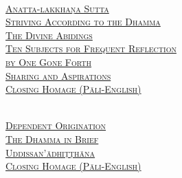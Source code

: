 {  {\libertinusFont\selectfont\textbf{\textsc{\ifafiveversion\fontsize{18}{12}\fi\ifninebythirteenversion\fontsize{13}{8.5}\fi\ifbfiveversion\fontsize{22}{18}\fi\selectfont{}}}}\\
  \textsc{\ifafiveversion\fontsize{14.4}{28}\fi\ifninebythirteenversion\fontsize{8.7}{17}\fi\ifbfiveversion\fontsize{16}{33.5}\fi\selectfont
    \hyperref[anatta-lakkhana]{Anatta-lakkhaṇa Sutta} \ifdigitalversion\else\pageref{anatta-lakkhana}\fi\\
    \hyperref[striving-according-to-dhamma]{Striving According to the Dhamma} \ifdigitalversion\else\pageref{striving-according-to-dhamma}\fi\\
    \hyperref[divine-abidings]{The Divine Abidings} \ifdigitalversion\else\pageref{divine-abidings}\fi\\
    \hyperref[ten-reflections]{Ten Subjects for Frequent Reflection\\ \ifafiveversion\vspace{-0.4cm}\fi \ifbfiveversion\vspace{-0.4cm}\fi \ifninebythirteenversion\vspace{-0.2cm}\fi by One Gone Forth} \ifdigitalversion\else\pageref{ten-reflections}\fi\\
    \hyperref[sharing-aspirations]{Sharing and Aspirations} \ifdigitalversion\else\pageref{sharing-aspirations}\fi\\
    \hyperref[closing-homage]{Closing Homage (Pāli-English)} \ifdigitalversion\else\pageref{closing-homage}\fi\\
  }

  \clearpage

  {\libertinusFont\selectfont\textbf{\textsc{\ifafiveversion\fontsize{18}{12}\fi\ifninebythirteenversion\fontsize{13}{8.5}\fi\ifbfiveversion\fontsize{22}{18}\fi\selectfont{}}}}\\
  \textsc{\ifafiveversion\fontsize{14.4}{28}\fi\ifninebythirteenversion\fontsize{8.7}{17}\fi\ifbfiveversion\fontsize{16}{33.5}\fi\selectfont
    \hyperref[dependent-origination]{Dependent Origination} \ifdigitalversion\else\pageref{dependent-origination}\fi\\
    \hyperref[dhamma-in-brief]{The Dhamma in Brief} \ifdigitalversion\else\pageref{dhamma-in-brief}\fi\\
    \hyperref[uddissanadhitthana]{Uddissan'ādhiṭṭhāna} \ifdigitalversion\else\pageref{uddissanadhitthana}\fi\\
    \hyperref[closing-homage]{Closing Homage (Pāli-English)} \ifdigitalversion\else\pageref{closing-homage}\fi\\
  }

}
